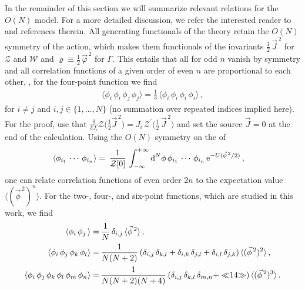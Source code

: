 In the remainder of this section we will summarize relevant relations for the $O(N)$ model.
For a more detailed discussion, we refer the interested reader to  and references therein.
All generating functionals of the theory retain the $O(N)$ symmetry of the action, which makes them functionals of the invariants $\tfrac{1}{2} \, \vec{J}^{\, 2}$ for $\mathcal{Z}$ and $\mathcal{W}$ and $\varrho \equiv \frac{1}{2} \, \vec{\varphi}^{\, 2}$ for $\Gamma$.
This entails that all \nptFunctions{} for odd $n$ vanish by symmetry and all correlation functions of a given order of even $n$ are proportional to each other, \eg{}, for the four-point function we find
\begin{align}
	\langle \phi_i \, \phi_i \, \phi_j \, \phi_j \rangle = \tfrac{1}{3} \, \langle \phi_i \, \phi_i \, \phi_i \, \phi_i \rangle\, ,
\end{align}
for $i\neq j$ and $i, j \in \{ 1, \ldots, N \}$ (no summation over repeated indices implied here).
For the proof, use that $\tfrac{\delta}{\delta J_i} \mathcal{Z} \big( \tfrac{1}{2} \vec{J}^{\, 2} \big) = J_i \, \mathcal{Z}^\prime \big( \tfrac{1}{2} \, \vec{J}^{\, 2} \big)$ and set the source $\vec{J} = 0$ at the end of the calculation.
Using the $O(N)$ symmetry on the \rhs{} of
\begin{align}
	\langle \phi_{i_1} \, \cdots \, \phi_{i_n} \rangle &= \, \frac{1}{\mathcal{Z} [0]} \, \int_{-\infty}^{+\infty} \dif^{\,N}\! \phi \, \phi_{i_1} \, \cdots \, \phi_{i_n} \, \eu^{- U ( \vec{\phi}^{\, 2}/2 ) } \, , \label{eq:def_corr_func_ON}
\end{align}
one can relate correlation functions of even order $2n$ to the expectation value $\langle ( \vec{\phi}^{\, 2} )^n \rangle$.
For the two-, four-, and six-point functions, which are studied in this work, we find
\begin{align}
	\langle \phi_i \, \phi_j \, \rangle = \, & \frac{1}{N} \, \delta_{i, j} \, \langle \vec{\phi}^{\, 2} \rangle \, ,\label{eq:on-model_relation_2pfi}
	\\[.1em]
	\langle \phi_i \, \phi_j \, \phi_k \, \phi_l \rangle = \, & \frac{1}{N ( N + 2 )} \, ( \delta_{i, j} \, \delta_{k,l} + \delta_{i, k} \, \delta_{j, l} + \delta_{i, l} \, \delta_{j, k} ) \, \langle ( \vec{\phi}^{\, 2} )^2 \rangle \, ,	\label{eq:on-model_relation_4pfi}
	\\[.1em]
	\langle \phi_i \, \phi_j \, \phi_k \, \phi_l \, \phi_m \, \phi_n \rangle = \, & \frac{1}{N ( N + 2 ) ( N + 4)} \, ( \delta_{i, j} \, \delta_{k, l} \, \delta_{m, n} + \skeleton{14} ) \, \langle ( \vec{\phi}^{\, 2} )^3 \rangle \, .	\label{eq:on-model_relation_6pfi}
\end{align}
